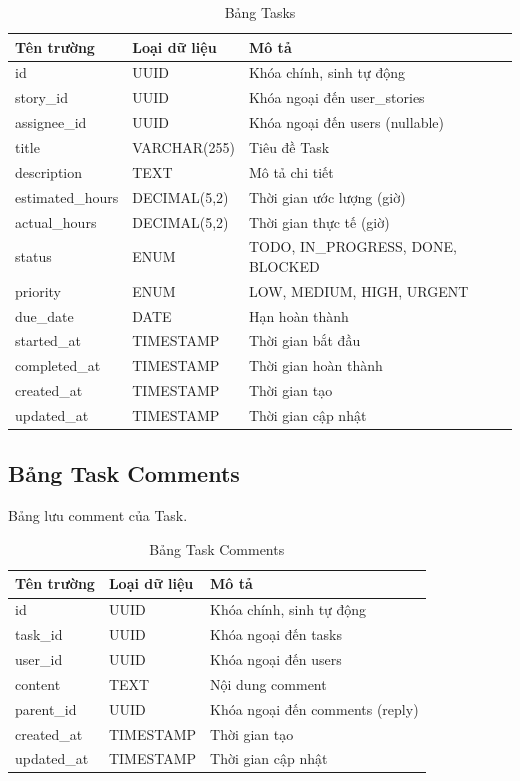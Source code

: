 \documentclass[12pt,a4paper]{report}
\begin{document}
\begin{table}[H]
\centering
\caption{Bảng Tasks}
\begin{tabular}{|p{4cm}|p{4cm}|p{7cm}|}
\hline
\textbf{Tên trường} & \textbf{Loại dữ liệu} & \textbf{Mô tả} \\
\hline
id & UUID & Khóa chính, sinh tự động \\
\hline
story\_id & UUID & Khóa ngoại đến user\_stories \\
\hline
assignee\_id & UUID & Khóa ngoại đến users (nullable) \\
\hline
title & VARCHAR(255) & Tiêu đề Task \\
\hline
description & TEXT & Mô tả chi tiết \\
\hline
estimated\_hours & DECIMAL(5,2) & Thời gian ước lượng (giờ) \\
\hline
actual\_hours & DECIMAL(5,2) & Thời gian thực tế (giờ) \\
\hline
status & ENUM & TODO, IN\_PROGRESS, DONE, BLOCKED \\
\hline
priority & ENUM & LOW, MEDIUM, HIGH, URGENT \\
\hline
due\_date & DATE & Hạn hoàn thành \\
\hline
started\_at & TIMESTAMP & Thời gian bắt đầu \\
\hline
completed\_at & TIMESTAMP & Thời gian hoàn thành \\
\hline
created\_at & TIMESTAMP & Thời gian tạo \\
\hline
updated\_at & TIMESTAMP & Thời gian cập nhật \\
\hline
\end{tabular}
\label{tab:tasks_table}
\end{table}


\subsection{Bảng Task Comments}

Bảng lưu comment của Task.

\begin{table}[H]
\centering
\caption{Bảng Task Comments}
\begin{tabular}{|p{4cm}|p{4cm}|p{7cm}|}
\hline
\textbf{Tên trường} & \textbf{Loại dữ liệu} & \textbf{Mô tả} \\
\hline
id & UUID & Khóa chính, sinh tự động \\
\hline
task\_id & UUID & Khóa ngoại đến tasks \\
\hline
user\_id & UUID & Khóa ngoại đến users \\
\hline
content & TEXT & Nội dung comment \\
\hline
parent\_id & UUID & Khóa ngoại đến comments (reply) \\
\hline
created\_at & TIMESTAMP & Thời gian tạo \\
\hline
updated\_at & TIMESTAMP & Thời gian cập nhật \\
\hline
\end{tabular}
\label{tab:task_comments_table}
\end{table}
\end{document}
